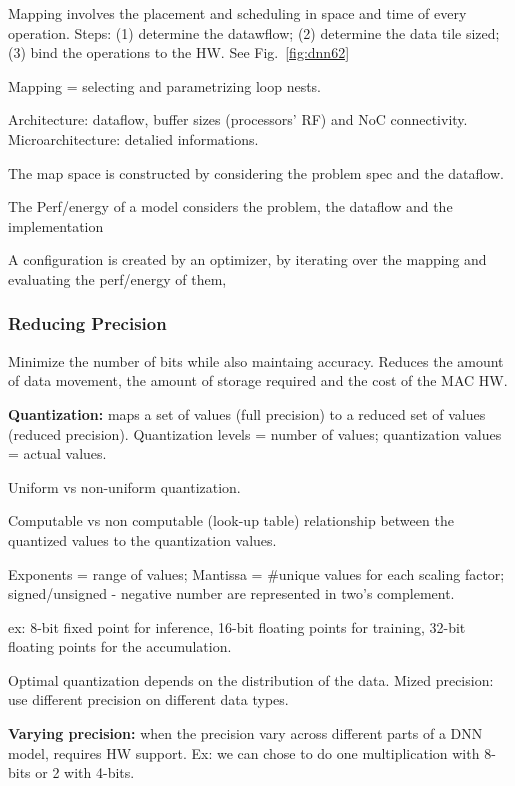 Mapping involves the placement and scheduling in space and time of every operation. Steps: (1) determine the datawflow; (2) determine the data tile sized; (3) bind the operations to the HW. See Fig.~\ref{fig:dnn62}
\begin{dashlist}
    \item Mapping = selecting and parametrizing loop nests.
    \item Architecture: dataflow, buffer sizes (processors' RF) and NoC connectivity. Microarchitecture: detalied informations.
    \item The map space is constructed by considering the problem spec and the dataflow.
    \item The Perf/energy of a model considers the problem, the dataflow and the implementation
    \item A configuration is created by an optimizer, by iterating over the mapping and evaluating the perf/energy of them,
\end{dashlist}

\subsubsection{Reducing Precision}
\begin{dashlist}
    \item Minimize the number of bits while also maintaing accuracy. Reduces the amount of data movement, the amount of storage required and the cost of the MAC HW.
    \item \textbf{Quantization:} maps a set of values (full precision) to a reduced set of values (reduced precision). Quantization levels = number of values; quantization values = actual values.
    \item Uniform vs non-uniform quantization.
    \item Computable vs non computable (look-up table) relationship between the quantized values to the quantization values.
    \item Exponents = range of values; Mantissa = \#unique values for each scaling factor; signed/unsigned - negative number are represented in two's complement.
    \item ex: 8-bit fixed point for inference, 16-bit floating points for training, 32-bit floating points for the accumulation.
    \item Optimal quantization depends on the distribution of the data. Mized precision: use different precision on different data types.
    \item \textbf{Varying precision:} when the precision vary across different parts of a DNN model, requires HW support. Ex: we can chose to do one multiplication with 8-bits or 2 with 4-bits.
\end{dashlist}

